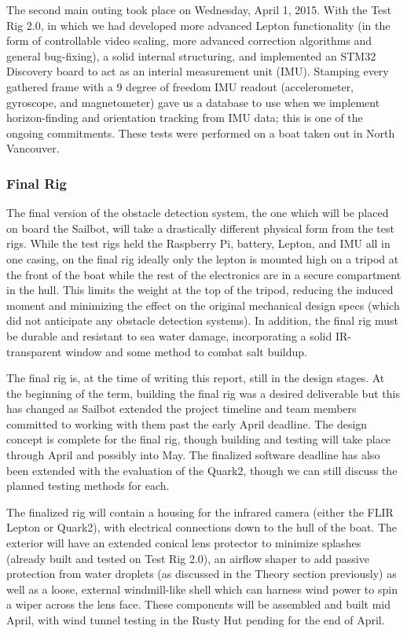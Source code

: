 The second main outing took place on Wednesday, April 1, 2015. With the Test Rig 2.0, in which we had developed more advanced Lepton functionality (in the form of controllable video scaling, more advanced correction algorithms and general bug-fixing), a solid internal structuring, and implemented an STM32 Discovery board to act as an interial measurement unit (IMU). Stamping every gathered frame with a 9 degree of freedom IMU readout (accelerometer, gyroscope, and magnetometer) gave us a database to use when we implement horizon-finding and orientation tracking from IMU data; this is one of the ongoing commitments. These tests were performed on a boat taken out in North Vancouver.


\subsubsection{\label{sec:discussion:testing:testrig3}Final Rig}
The final version of the obstacle detection system, the one which will be placed on board the Sailbot, will take a drastically different physical form from the test rigs. While the test rigs held the Raspberry Pi, battery, Lepton, and IMU all in one casing, on the final rig ideally only the lepton is mounted high on a tripod at the front of the boat while the rest of the electronics are in a secure compartment in the hull. This limits the weight at the top of the tripod, reducing the induced moment and minimizing the effect on the original mechanical design specs (which did not anticipate any obstacle detection systems). In addition, the final rig must be durable and resistant to sea water damage, incorporating a solid IR-transparent window and some method to combat salt buildup. 

The final rig is, at the time of writing this report, still in the design stages. At the beginning of the term, building the final rig was a desired deliverable but this has changed as Sailbot extended the project timeline and team members committed to working with them past the early April deadline. The design concept is complete for the final rig, though building and testing will take place through April and possibly into May. The finalized software deadline has also been extended with the evaluation of the Quark2, though we can still discuss the planned testing methods for each.

The finalized rig will contain a housing for the infrared camera (either the FLIR Lepton or Quark2), with electrical connections down to the hull of the boat. The exterior will have an extended conical lens protector to minimize splashes (already built and tested on Test Rig 2.0), an airflow shaper to add passive protection from water droplets (as discussed in the Theory section previously) as well as a loose, external windmill-like shell which can harness wind power to spin a wiper across the lens face. These components will be assembled and built mid April, with wind tunnel testing in the Rusty Hut pending for the end of April.

